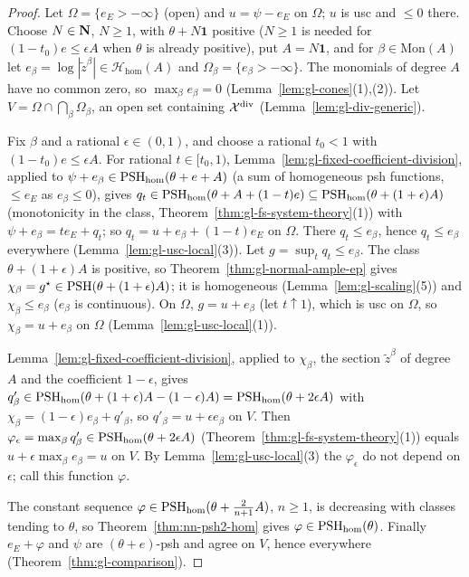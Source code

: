 \begin{proof}
Let $\Omega=\{e_E>-\infty\}$ (open) and $u=\psi-e_E$ on $\Omega$; $u$ is usc and $\le0$ there. Choose $N\in\mathbf{N}$, $N\ge1$, with $\theta+N\mathbf 1$ positive ($N\ge1$ is needed for $(1-t_0)e\le\epsilon A$ when $\theta$ is already positive), put $A=N\mathbf1$,
and for $\beta\in\mathrm{Mon}(A)$ let $e_\beta=\log|\tilde z^\beta|\in\mathcal H_{\mathrm{hom}}(A)$ and $\Omega_\beta=\{e_\beta>-\infty\}$. The monomials of degree $A$ have no
common zero, so $\max_\beta e_\beta=0$ (Lemma~\ref{lem:gl-cones}(1),(2)). Let $V=\Omega\cap\bigcap_\beta\Omega_\beta$, an open set containing $\mathcal X^{\mathrm{div}}$
(Lemma~\ref{lem:gl-div-generic}).

Fix $\beta$ and a rational $\epsilon\in(0,1)$, and choose a rational $t_0<1$ with $(1-t_0)e\le\epsilon A$. For rational $t\in[t_0,1)$,
Lemma~\ref{lem:gl-fixed-coefficient-division}, applied to $\psi+e_\beta\in\operatorname{PSH}_{\mathrm{hom}}(\theta+e+A)$ (a sum of homogeneous psh functions, $\le e_E$ as
$e_\beta\le0$), gives $q_t\in\operatorname{PSH}_{\mathrm{hom}}(\theta+A+(1-t)e)\subseteq\operatorname{PSH}_{\mathrm{hom}}(\theta+(1+\epsilon)A)$ (monotonicity in the class,
Theorem~\ref{thm:gl-fs-system-theory}(1)) with $\psi+e_\beta=te_E+q_t$; so $q_t=u+e_\beta+(1-t)e_E$ on $\Omega$. There $q_t\le e_\beta$, hence
$q_t\le e_\beta$ everywhere (Lemma~\ref{lem:gl-usc-local}(3)). Let $g=\sup_tq_t\le e_\beta$. The class $\theta+(1+\epsilon)A$ is positive, so
Theorem~\ref{thm:gl-normal-ample-ep} gives $\chi_\beta=g^\star\in\operatorname{PSH}(\theta+(1+\epsilon)A)$; it is homogeneous (Lemma~\ref{lem:gl-scaling}(5)) and
$\chi_\beta\le e_\beta$ ($e_\beta$ is continuous). On $\Omega$, $g=u+e_\beta$ (let $t\uparrow1$), which is usc on $\Omega$, so $\chi_\beta=u+e_\beta$ on $\Omega$
(Lemma~\ref{lem:gl-usc-local}(1)).

Lemma~\ref{lem:gl-fixed-coefficient-division}, applied to $\chi_\beta$, the section $\tilde z^\beta$ of degree $A$ and the coefficient $1-\epsilon$, gives
$q'_\beta\in\operatorname{PSH}_{\mathrm{hom}}(\theta+(1+\epsilon)A-(1-\epsilon)A)=\operatorname{PSH}_{\mathrm{hom}}(\theta+2\epsilon A)$ with $\chi_\beta=(1-\epsilon)e_\beta+q'_\beta$, so
$q'_\beta=u+\epsilon e_\beta$ on $V$. Then $\varphi_\epsilon=\max_\beta q'_\beta\in\operatorname{PSH}_{\mathrm{hom}}(\theta+2\epsilon A)$ (Theorem~\ref{thm:gl-fs-system-theory}(1)) equals
$u+\epsilon\max_\beta e_\beta=u$ on $V$. By Lemma~\ref{lem:gl-usc-local}(3) the $\varphi_\epsilon$ do not depend on $\epsilon$; call this function $\varphi$.

The constant sequence $\varphi\in\operatorname{PSH}_{\mathrm{hom}}(\theta+\frac2{n+1}A)$, $n\ge1$, is decreasing with classes tending to $\theta$, so
Theorem~\ref{thm:nn-psh2-hom} gives $\varphi\in\operatorname{PSH}_{\mathrm{hom}}(\theta)$. Finally $e_E+\varphi$ and $\psi$ are $(\theta+e)$-psh and agree on $V$, hence
everywhere (Theorem~\ref{thm:gl-comparison}).
\end{proof}

